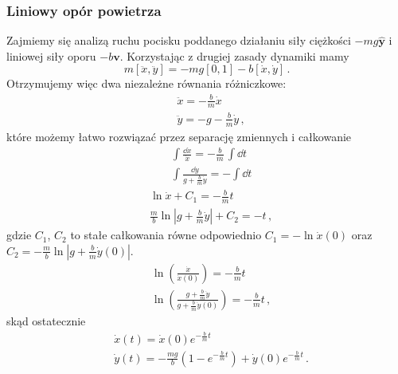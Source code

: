 \documentclass[../main.tex]{subfiles}
\begin{document}
\subsubsection*{Liniowy opór powietrza}
Zajmiemy się analizą ruchu pocisku poddanego działaniu siły ciężkości \(-mg\mathbf{\hat y}\) i liniowej siły oporu \(-b\mathbf{v}\). Korzystając z drugiej zasady dynamiki mamy
\begin{equation*}
    m[\ddot x,\ddot y]=-mg[0,1]-b[\dot x,\dot y]\,.
\end{equation*}
Otrzymujemy więc dwa niezależne równania różniczkowe:
\begin{equation*}
    \begin{split}
        &\ddot x=-\frac{b}{m}\dot x\\
        &\ddot y=-g-\frac{b}{m}\dot y\,,
    \end{split}
\end{equation*}
które możemy łatwo rozwiązać przez separację zmiennych i całkowanie  
\begin{equation*}
    \begin{split}
        &\int\frac{\dd\dot x}{\dot x}=-\frac{b}{m}\,\int \dd t\\
        &\int\frac{\dd\dot y}{g+\frac{b}{m}\dot y}=-\int \dd t
    \end{split}
\end{equation*}
\begin{equation*}
    \begin{split}
        &\ln\dot x+C_1=-\frac{b}{m}t\\
        &\frac{m}{b}\ln\left|g+\frac{b}{m}\dot y\right|+C_2=-t\,,
    \end{split}
\end{equation*}
gdzie \(C_1\), \(C_2\) to stałe całkowania równe odpowiednio \(C_1=-\ln\dot x(0)\) oraz \(C_2=-\frac{m}{b}\ln|g+\frac{b}{m}\dot y(0)|\).
\begin{equation*}
\begin{split}
    &\ln\left(\frac{\dot x}{\dot x(0)}\right)=-\frac{b}{m}t\\
    &\ln\left(\frac{g+\frac{b}{m}\dot y}{g+\frac{b}{m}\dot y(0)}\right)=-\frac{b}{m}t\,,
\end{split}
\end{equation*}
skąd ostatecznie
\begin{equation*}
    \begin{split}
        &\dot x(t)=\dot x(0)e^{-\frac{b}{m}t}\\
        &\dot y(t)=-\frac{mg}{b}\left(1-e^{-\frac{b}{m}t}\right)+\dot y(0)e^{-\frac{b}{m}t}\,.
    \end{split}
\end{equation*}
\end{document}
